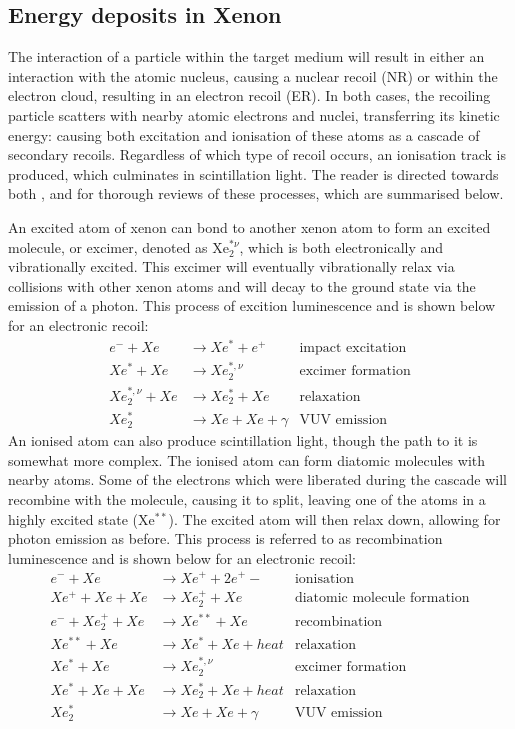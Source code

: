 \subsection{Energy deposits in Xenon}
\par
The interaction of a particle within the target medium will result in either an interaction with the atomic nucleus, causing a nuclear recoil (NR) or within the electron cloud, resulting in an electron recoil (ER).
In both cases, the recoiling particle scatters with nearby atomic electrons and nuclei, transferring its kinetic energy: causing both excitation and ionisation of these atoms as a cascade of secondary recoils.
Regardless of which type of recoil occurs, an ionisation track is produced, which culminates in scintillation light.
The reader is directed towards both \cite{xenon_physics_ref}, and \cite{carldahl_thesis_ref} for thorough reviews of these processes, which are summarised below.
\par
An excited atom of xenon can bond to another xenon atom to form an excited molecule, or excimer, denoted as Xe$_2^{*\nu}$, which is both electronically and vibrationally excited.
This excimer will eventually vibrationally relax via collisions with other xenon atoms and will decay to the ground state via the emission of a photon.
This process of excition luminescence and is shown below for an electronic recoil:
\begin{align*}
    e^- + Xe &\rightarrow Xe^* + e^+  &\text{impact excitation} \\ 
    Xe^* + Xe &\rightarrow Xe_2^{*,\nu} &\text{excimer formation} \\
    Xe_2^{*,\nu} + Xe &\rightarrow Xe_2^* + Xe &\text{relaxation} \\
    Xe_2^* &\rightarrow Xe + Xe + \gamma &\text{VUV emission} 
\end{align*}
An ionised atom can also produce scintillation light, though the path to it is somewhat more complex.
The ionised atom can form diatomic molecules with nearby atoms.
Some of the electrons which were liberated during the cascade will recombine with the molecule, causing it to split, leaving one of the atoms in a highly excited state (Xe$^{**}$).
The excited atom will then relax down, allowing for photon emission as before.
This process is referred to as recombination luminescence and is shown below for an electronic recoil:
\begin{align*}
    e^- + Xe &\rightarrow Xe^+ + 2e^+- &\text{ionisation} \\ 
    Xe^+ + Xe + Xe &\rightarrow Xe_2^{+} + Xe &\text{diatomic molecule formation} \\
    e^- + Xe_2^+ + Xe&\rightarrow Xe^{**} + Xe &\text{recombination} \\
    Xe^{**} + Xe &\rightarrow Xe^{*} + Xe + heat &\text{relaxation} \\
    Xe^{*} + Xe  &\rightarrow Xe_2^{*,\nu} &\text{excimer formation} \\
    Xe^{*} + Xe + Xe &\rightarrow Xe_2^{*} + Xe + heat &\text{relaxation} \\
    Xe_2^* &\rightarrow Xe + Xe + \gamma &\text{VUV emission} 
\end{align*}
